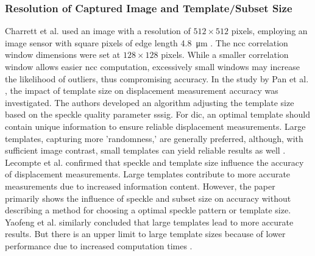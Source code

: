     \subsubsection{Resolution of Captured Image and Template/Subset Size}\label{subsubsection:template_size}
    Charrett et al. used an image with a resolution of \(512 \times 512\) pixels, employing an image sensor with square pixels of edge length \SI{4.8}{\micro\meter} \cite{charrett_2018}. The \gls{ncc} correlation window dimensions were set at \(128 \times 128\) pixels. While a smaller correlation window allows easier \gls{ncc} computation, excessively small windows may increase the likelihood of outliers, thus compromising accuracy. In the study by Pan et al. \cite{pan_subset}, the impact of template size on displacement measurement accuracy was investigated. The authors developed an algorithm adjusting the template size based on the speckle quality parameter \gls{sssig}. For \gls{dic}, an optimal template should contain unique information to ensure reliable displacement measurements. Large templates, capturing more 'randomness,' are generally preferred, although, with sufficient image contrast, small templates can yield reliable results as well \cite{pan_subset}. Lecompte et al. \cite{lecompte} confirmed that speckle and template size influence the accuracy of displacement measurements. Large templates contribute to more accurate measurements due to increased information content. However, the paper primarily shows the influence of speckle and subset size on accuracy without describing a method for choosing a optimal speckle pattern or template size. Yaofeng et al. similarly concluded that large templates lead to more accurate results. But there is an upper limit to large template sizes because of lower performance due to increased computation times \cite{yaofeng}.

